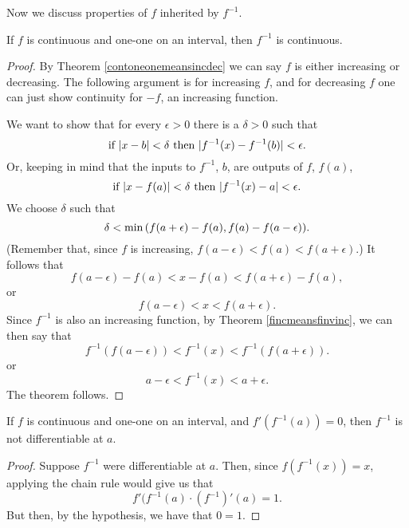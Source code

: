 Now we discuss properties of $f$ inherited by $f^{-1}$.

\begin{theorem} \label{fcontmeansfinvcont}
If $f$ is continuous and one-one on an interval, then $f^{-1}$ is continuous.

\begin{proof}
By Theorem \ref{contoneonemeansincdec} we can say $f$ is either increasing or decreasing. The following argument is for increasing $f$, and for decreasing $f$ one can just show continuity for $-f$, an increasing function.

We want to show that for every $\epsilon > 0$ there is a $\delta > 0$ such that 
\[ \rmif\ |x - b| < \delta\ \rmthen\ |f^{-1}(x) - f^{-1}(b)| < \epsilon. \]
Or, keeping in mind that the inputs to $f^{-1}$, $b$, are outputs of $f$, $f(a)$, 
\[ \rmif\ |x - f(a)| < \delta\ \rmthen\ |f^{-1}(x) - a| < \epsilon. \]
We choose $\delta$ such that 
\[ \delta < \mathrm{min}\,(f(a + \epsilon) - f(a), f(a) - f(a - \epsilon)). \]
(Remember that, since $f$ is increasing, $f(a - \epsilon) < f(a) < f(a + \epsilon)$.)
It follows that
\[ f(a - \epsilon) - f(a) < x - f(a) < f(a + \epsilon) - f(a), \]
or
\[ f(a - \epsilon) < x < f(a + \epsilon). \]
Since $f^{-1}$ is also an increasing function, by Theorem \ref{fincmeansfinvinc}, we can then say that
\[ f^{-1}(f(a - \epsilon)) < f^{-1}(x) < f^{-1}(f(a + \epsilon)). \]
or 
\[ a - \epsilon < f^{-1}(x) < a + \epsilon. \]
The theorem follows.
\end{proof}
\end{theorem}

\begin{theorem}
If $f$ is continuous and one-one on an interval, and $f'(f^{-1}(a)) = 0$, then $f^{-1}$ is not differentiable at $a$.

\begin{proof}
Suppose $f^{-1}$ were differentiable at $a$. Then, since $f(f^{-1}(x)) = x$, applying the chain rule would give us that
\[ f'(f^{-1}(a) \cdot (f^{-1})'(a) = 1. \]
But then, by the hypothesis, we have that $0 = 1$.
\end{proof}
\end{theorem}

